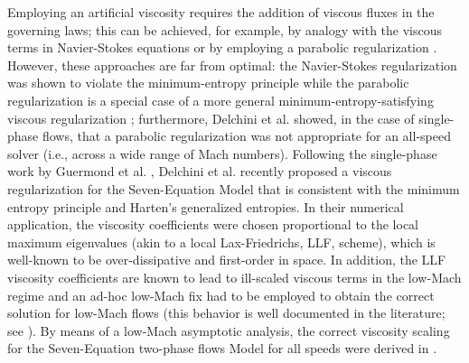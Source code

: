 \documentclass[preprint,10pt]{elsarticle}
\begin{document}
Employing an artificial viscosity requires the addition of viscous fluxes in the governing laws; this can be achieved, for example, by analogy with 
the viscous terms in Navier-Stokes equations \cite{Pasquetti_NS2006, GuermondJCP2011} or by employing a parabolic regularization \cite{PertheneNumMath1996-parabolic}. 
However, these approaches are far from optimal:
the Navier-Stokes regularization was shown to violate the minimum-entropy principle while the parabolic regularization is a special case of a more general
minimum-entropy-satisfying viscous regularization \cite{GuermondSIAM2014}; furthermore, Delchini et al. \cite{DelchiniCompFluid2014-euler} 
showed, in the case of single-phase flows, that a parabolic regularization was not appropriate for an all-speed solver (i.e., across a wide range of Mach numbers).
%
Following the single-phase work by Guermond et al. 
\cite{GuermondSIAM2014, GuermondCSE2011,  GuermondJCP2011, GuermondCRA2008, GuermondSIAM2014}, 
Delchini et al. \cite{Marco_paper_sem} recently proposed a viscous regularization for the Seven-Equation Model that is consistent with the minimum entropy principle and Harten's generalized entropies. In their numerical application, the viscosity coefficients were chosen proportional to the local maximum eigenvalues (akin to a local Lax-Friedrichs, LLF, scheme), which is well-known to be over-dissipative and first-order in space. In addition, the LLF viscosity coefficients are known to
lead to ill-scaled viscous terms in the low-Mach regime and an ad-hoc low-Mach fix had to be employed to obtain the correct solution for low-Mach flows (this 
behavior is well documented in the literature; see \cite{LowMach1, LowMach2, LowMach3}). By means of a low-Mach asymptotic analysis, the correct
viscosity scaling for the Seven-Equation two-phase flows Model for all speeds were derived in \cite{Marco_paper_sem}.
\end{document}
